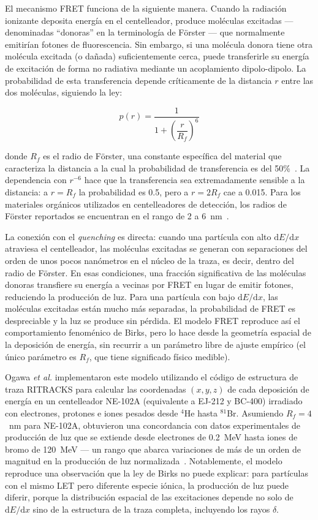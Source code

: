 \documentclass[11pt,a4paper]{article}
\begin{document}
El mecanismo FRET funciona de la siguiente manera. Cuando la radiación ionizante deposita energía en el centelleador, produce moléculas excitadas --- denominadas ``donoras'' en la terminología de Förster --- que normalmente emitirían fotones de fluorescencia. Sin embargo, si una molécula donora tiene otra molécula excitada (o dañada) suficientemente cerca, puede transferirle su energía de excitación de forma no radiativa mediante un acoplamiento dipolo-dipolo. La probabilidad de esta transferencia depende críticamente de la distancia $r$ entre las dos moléculas, siguiendo la ley:

\begin{equation}
p(r) = \frac{1}{1 + \left(\dfrac{r}{R_f}\right)^{6}}
\label{eq:fret}
\end{equation}

\noindent donde $R_f$ es el radio de Förster, una constante específica del material que caracteriza la distancia a la cual la probabilidad de transferencia es del 50\%~\cite{ogawa2018}. La dependencia con $r^{-6}$ hace que la transferencia sea extremadamente sensible a la distancia: a $r = R_f$ la probabilidad es 0.5, pero a $r = 2R_f$ cae a 0.015. Para los materiales orgánicos utilizados en centelleadores de detección, los radios de Förster reportados se encuentran en el rango de 2 a 6~nm~\cite{ogawa2018}.

La conexión con el \textit{quenching} es directa: cuando una partícula con alto $\mathrm{d}E/\mathrm{d}x$ atraviesa el centelleador, las moléculas excitadas se generan con separaciones del orden de unos pocos nanómetros en el núcleo de la traza, es decir, dentro del radio de Förster. En esas condiciones, una fracción significativa de las moléculas donoras transfiere su energía a vecinas por FRET en lugar de emitir fotones, reduciendo la producción de luz. Para una partícula con bajo $\mathrm{d}E/\mathrm{d}x$, las moléculas excitadas están mucho más separadas, la probabilidad de FRET es despreciable y la luz se produce sin pérdida. El modelo FRET reproduce así el comportamiento fenoménico de Birks, pero lo hace desde la geometría espacial de la deposición de energía, sin recurrir a un parámetro libre de ajuste empírico (el único parámetro es $R_f$, que tiene significado físico medible).

Ogawa \textit{et al.} implementaron este modelo utilizando el código de estructura de traza RITRACKS para calcular las coordenadas $(x,y,z)$ de cada deposición de energía en un centelleador NE-102A (equivalente a EJ-212 y BC-400) irradiado con electrones, protones e iones pesados desde $^{4}$He hasta $^{81}$Br. Asumiendo $R_f = 4$~nm para NE-102A, obtuvieron una concordancia con datos experimentales de producción de luz que se extiende desde electrones de 0.2~MeV hasta iones de bromo de 120~MeV --- un rango que abarca variaciones de más de un orden de magnitud en la producción de luz normalizada~\cite{ogawa2018}. Notablemente, el modelo reproduce una observación que la ley de Birks no puede explicar: para partículas con el mismo LET pero diferente especie iónica, la producción de luz puede diferir, porque la distribución espacial de las excitaciones depende no solo de $\mathrm{d}E/\mathrm{d}x$ sino de la estructura de la traza completa, incluyendo los rayos $\delta$.
\end{document}
